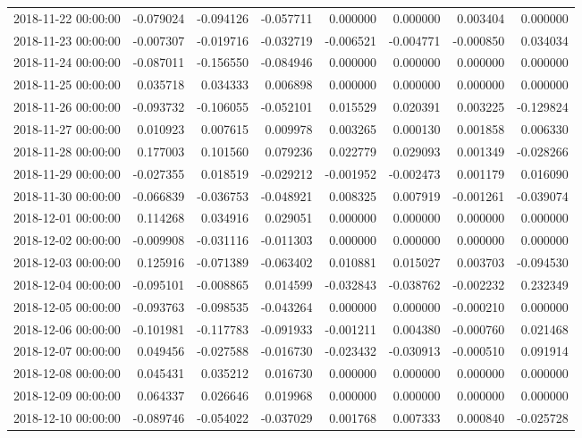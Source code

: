 \begin{tabular}{lrrrrrrr}
2018-11-22 00:00:00 & -0.079024 & -0.094126 & -0.057711 & 0.000000 & 0.000000 & 0.003404 & 0.000000 \\
2018-11-23 00:00:00 & -0.007307 & -0.019716 & -0.032719 & -0.006521 & -0.004771 & -0.000850 & 0.034034 \\
2018-11-24 00:00:00 & -0.087011 & -0.156550 & -0.084946 & 0.000000 & 0.000000 & 0.000000 & 0.000000 \\
2018-11-25 00:00:00 & 0.035718 & 0.034333 & 0.006898 & 0.000000 & 0.000000 & 0.000000 & 0.000000 \\
2018-11-26 00:00:00 & -0.093732 & -0.106055 & -0.052101 & 0.015529 & 0.020391 & 0.003225 & -0.129824 \\
2018-11-27 00:00:00 & 0.010923 & 0.007615 & 0.009978 & 0.003265 & 0.000130 & 0.001858 & 0.006330 \\
2018-11-28 00:00:00 & 0.177003 & 0.101560 & 0.079236 & 0.022779 & 0.029093 & 0.001349 & -0.028266 \\
2018-11-29 00:00:00 & -0.027355 & 0.018519 & -0.029212 & -0.001952 & -0.002473 & 0.001179 & 0.016090 \\
2018-11-30 00:00:00 & -0.066839 & -0.036753 & -0.048921 & 0.008325 & 0.007919 & -0.001261 & -0.039074 \\
2018-12-01 00:00:00 & 0.114268 & 0.034916 & 0.029051 & 0.000000 & 0.000000 & 0.000000 & 0.000000 \\
2018-12-02 00:00:00 & -0.009908 & -0.031116 & -0.011303 & 0.000000 & 0.000000 & 0.000000 & 0.000000 \\
2018-12-03 00:00:00 & 0.125916 & -0.071389 & -0.063402 & 0.010881 & 0.015027 & 0.003703 & -0.094530 \\
2018-12-04 00:00:00 & -0.095101 & -0.008865 & 0.014599 & -0.032843 & -0.038762 & -0.002232 & 0.232349 \\
2018-12-05 00:00:00 & -0.093763 & -0.098535 & -0.043264 & 0.000000 & 0.000000 & -0.000210 & 0.000000 \\
2018-12-06 00:00:00 & -0.101981 & -0.117783 & -0.091933 & -0.001211 & 0.004380 & -0.000760 & 0.021468 \\
2018-12-07 00:00:00 & 0.049456 & -0.027588 & -0.016730 & -0.023432 & -0.030913 & -0.000510 & 0.091914 \\
2018-12-08 00:00:00 & 0.045431 & 0.035212 & 0.016730 & 0.000000 & 0.000000 & 0.000000 & 0.000000 \\
2018-12-09 00:00:00 & 0.064337 & 0.026646 & 0.019968 & 0.000000 & 0.000000 & 0.000000 & 0.000000 \\
2018-12-10 00:00:00 & -0.089746 & -0.054022 & -0.037029 & 0.001768 & 0.007333 & 0.000840 & -0.025728 \\

\end{tabular}
